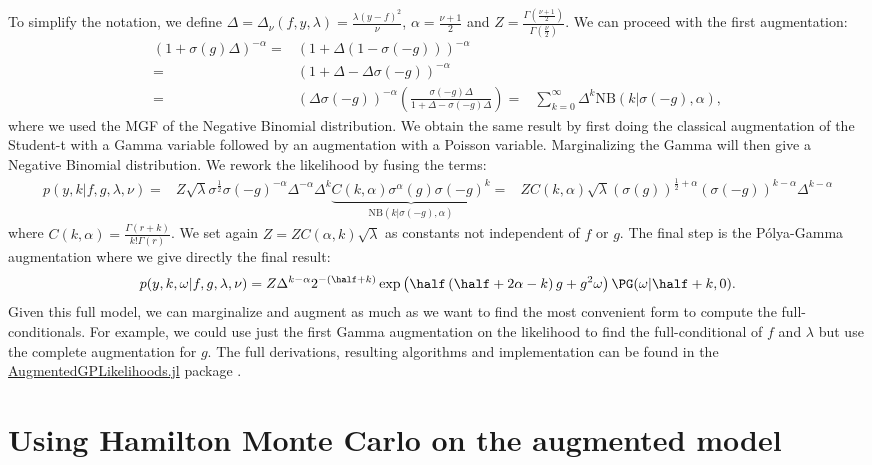 To simplify the notation, we define $\Delta=\Delta_\nu(f,y,\lambda) = \frac{\lambda(y-f)^2}{\nu}$, $\alpha =\frac{\nu+1}{2}$ and $Z = \frac{\Gamma(\frac{\nu+1}{2})}{\Gamma(\frac{\nu}{2})}$.
We can proceed with the first augmentation:
\begin{align*}
    (1 + \sigma(g)\Delta)^{-\alpha} =& (1 + \Delta(1 - \sigma(-g)))^{-\alpha}\\
    =&(1 + \Delta - \Delta\sigma(-g))^{-\alpha}\\
    =& (\Delta\sigma(-g))^{-\alpha}\left(\frac{\sigma(-g)\Delta}{1 + \Delta -\sigma(-g)\Delta}\right)
    =&\sum_{k=0}^{\infty} \Delta^k \mathrm{NB}(k|\sigma(-g),\alpha),
\end{align*}
where we used the \ac{MGF} of the Negative Binomial distribution.
We obtain the same result by first doing the classical augmentation of the Student-t with a Gamma variable followed by an augmentation with a Poisson variable.
Marginalizing the Gamma will then give a Negative Binomial distribution.
We rework the likelihood by fusing the terms:
\begin{align*}
    p(y,k|f,g,\lambda,\nu) =& Z\sqrt{\lambda}\sigma^{\frac{1}{2}}\sigma(-g)^{-\alpha}\Delta^{-\alpha}\Delta^k\underbrace{C(k,\alpha)\sigma^{\alpha}(g)\sigma(-g)^k}_{\mathrm{NB}(k|\sigma(-g),\alpha)}
    =& ZC(k,\alpha)\sqrt{\lambda}(\sigma(g))^{\frac{1}{2}+\alpha}(\sigma(-g))^{k-\alpha}\Delta^{k-\alpha}
\end{align*}
where $C(k, \alpha) = \frac{\Gamma(r + k)}{k!\Gamma(r)}$.
We set again $Z=ZC(\alpha,k)\sqrt{\lambda}$ as constants not independent of $f$ or $g$.
The final step is the P\'olya-Gamma augmentation where we give directly the final result:
\begin{align}
    p(y,k,\omega|f,g,\lambda,\nu) = Z\Delta^{k-\alpha}2^{-(\half+k)}\exp\left(\half\left(\half + 2\alpha - k\right)g + g^2\omega\right)\PG(\omega|\half+k,0).
\end{align}
Given this full model, we can marginalize and augment as much as we want to find the most convenient form to compute the full-conditionals.
For example, we could use just the first Gamma augmentation on the likelihood to find the full-conditional of $f$ and $\lambda$ but use the complete augmentation for $g$.
The full derivations, resulting algorithms and implementation can be found in the  \href{https://github.com/JuliaGaussianProcesses/AugmentedGPLikelihoods.jl}{AugmentedGPLikelihoods.jl} package \cite{theo_galy_fajou_2022_6347022}.

\section{Using Hamilton Monte Carlo on the augmented model}

